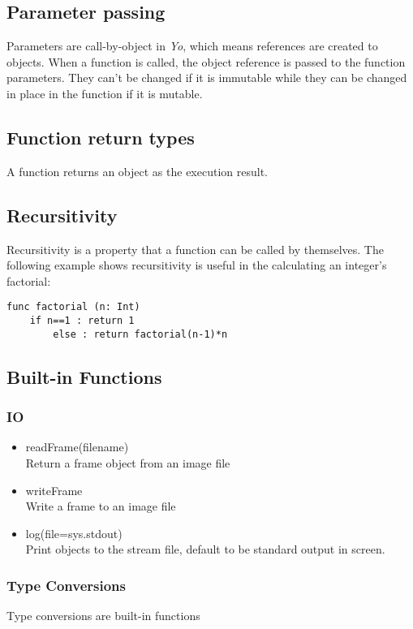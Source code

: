 \documentclass[12pt]{article}
\begin{document}
\subsection{Parameter passing}
\label{sec:paramPassing}
Parameters are call-by-object in \textit{Yo}, which means references are created to objects. When a function is called, the object reference is passed to the function parameters. They can't be changed if it is immutable while they can be changed in place in the function if it is mutable.  
\subsection{Function return types}
A function returns an object as the execution result. 
\subsection{Recursitivity} %
Recursitivity is a property that a function can be called by themselves. The following example shows recursitivity is useful in the calculating an integer's factorial:
\begin{lstlisting}[caption=Calculate the factorial of n]
 func factorial (n: Int)
    if n==1 : return 1
        else : return factorial(n-1)*n
\end{lstlisting}

\subsection{Built-in Functions} %
\subsubsection{IO}
\begin{itemize}
  \item readFrame(filename) \\
    Return a frame object from an image file
    \item writeFrame \\
    Write a frame to an image file
    \item log(file=sys.stdout) \\
    Print objects to the stream file, default to be standard output in screen.
\end{itemize}
\subsubsection{Type Conversions}
Type conversions are built-in functions 
\end{document}
